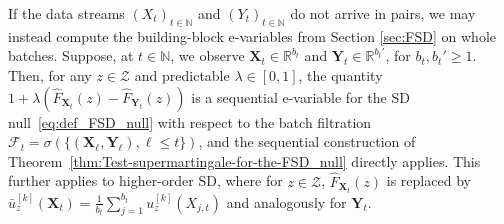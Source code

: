 \documentclass[12pt,twoside]{article}
\theoremstyle{plain}
\theoremstyle{definition}
\theoremstyle{remark}
\newcommand{\N}{\mathbb{N}}
\newcommand{\R}{\mathbb{R}}
\newcommand{\calF}{\mathcal{F}}
\newcommand{\calZ}{\mathcal{Z}}
\begin{document}
If the data streams $(X_t)_{t\in \N}$ and $(Y_t)_{t\in \N}$ do not arrive in pairs, we may instead compute the building-block e-variables from Section \ref{sec:FSD} on whole batches.
Suppose, at $t\in \N$, we observe $\boldsymbol{X}_t \in \R^{b_t}$ and $\boldsymbol{Y}_t \in \R^{b_t'}$, for $b_t,b_t'\geq 1$.
Then, for any $z\in \calZ$ and predictable $\lambda \in [0,1]$, the quantity $1+\lambda(\hat{F}_{{\boldsymbol{X}_t}}(z)-\hat{F}_{{\boldsymbol{Y}_t}}(z))$ is a sequential e-variable for the SD null~\eqref{eq:def_FSD_null} with respect to the batch filtration $\calF_t= \sigma(\{(\boldsymbol{X}_\ell ,\boldsymbol{Y}_\ell ), \ell \leq t\})$, and the sequential construction of Theorem~\ref{thm:Test-supermartingale-for-the-FSD_null} directly applies. 
This further applies to higher-order SD, where for $z\in \calZ$, $\hat{F}_{{\boldsymbol{X}_t}}(z)$ is replaced by $\bar{u}_{z}^{[k]}(\boldsymbol{X}_t)=\frac{1}{b_t}\sum_{j=1}^{b_t} u^{[k]}_z(X_{j,t})$ and analogously for $\boldsymbol{Y}_t$.
\end{document}
